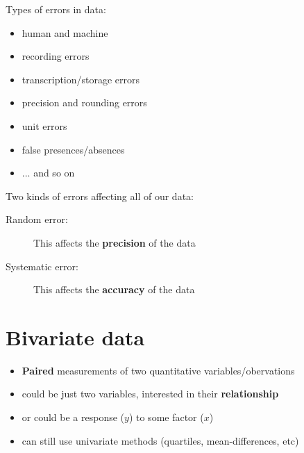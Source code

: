 Types of errors in data:
\begin{itemize}
	\item human and machine
	\item recording errors
	\item transcription/storage errors
	\item precision and rounding errors
	\item unit errors
	\item false presences/absences
	\item ... and so on	
\end{itemize}

Two kinds of errors affecting all of our data:
\begin{description}
	\item[Random error:] This affects the \textbf{precision} of the data
	\item[Systematic error:] This affects the \textbf{accuracy} of the data
\end{description}

\section{Bivariate data}
\begin{itemize}
	\item\textbf{Paired} measurements of two quantitative variables/obervations
	\item could be just two variables, interested in their \textbf{relationship}
	\item or could be a response ($y$) to some factor ($x$)
	\item can still use univariate methods (quartiles, mean-differences, etc)	
\end{itemize}
